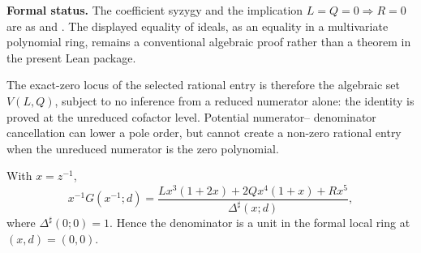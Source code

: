 \noindent\textbf{Formal status.}
The coefficient syzygy and the implication $L=Q=0\Rightarrow R=0$ are
 as
 and
.  The displayed
equality of ideals, as an equality in a multivariate polynomial ring, remains
a conventional algebraic proof rather than a theorem in the present Lean
package.

The exact-zero locus of the selected rational entry is therefore the algebraic
set \(V(L,Q)\), subject to no inference from a reduced numerator alone: the
identity is proved at the unreduced cofactor level.  Potential numerator--
denominator cancellation can lower a pole order, but cannot create a non-zero
rational entry when the unreduced numerator is the zero polynomial.

\begin{corollary}\label{cor:transformed}
With \(x=z^{-1}\),
\begin{equation}
x^{-1}G(x^{-1};d)=
\frac{Lx^3(1+2x)+2Qx^4(1+x)+Rx^5}{\Delta^\sharp(x;d)},
\end{equation}
where \(\Delta^\sharp(0;0)=1\).  Hence the denominator is a unit in the formal
local ring at \((x,d)=(0,0)\).
\end{corollary}
